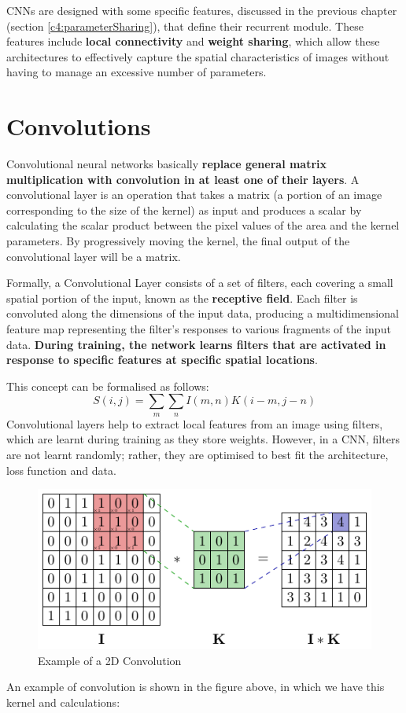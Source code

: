 CNNs are designed with some specific features, discussed in the previous chapter (section \ref{c4:parameterSharing}), that define their recurrent module. These features include \textbf{local connectivity} and \textbf{weight sharing}, which allow these architectures to effectively capture the spatial characteristics of images without having to manage an excessive number of parameters.

\section{Convolutions}

Convolutional neural networks basically \textbf{replace general matrix multiplication with convolution in at least one of their layers}. A convolutional layer is an operation that takes a matrix (a portion of an image corresponding to the size of the kernel) as input and produces a scalar by calculating the scalar product between the pixel values of the area and the kernel parameters. By progressively moving the kernel, the final output of the convolutional layer will be a matrix. 

Formally, a Convolutional Layer consists of a set of filters, each covering a small spatial portion of the input, known as the \textbf{receptive field}. Each filter is convoluted along the dimensions of the input data, producing a multidimensional feature map representing the filter's responses to various fragments of the input data. \textbf{During training, the network learns filters that are activated in response to specific features at specific spatial locations}.

This concept can be formalised as follows:
$$
S(i,j) = \sum_{m}\sum_{n} I(m,n)K(i-m,j-n)
$$
Convolutional layers help to extract local features from an image using filters, which are learnt during training as they store weights. However, in a CNN, filters are not learnt randomly; rather, they are optimised to best fit the architecture, loss function and data.


\begin{figure}[!htbp]
    \centering
    \includegraphics[width=\textwidth]{tikz/chapter5 - Convolution.pdf}
    \caption{Example of a 2D Convolution}
\end{figure}
An example of convolution is shown in the figure above, in which we have this kernel and calculations:

